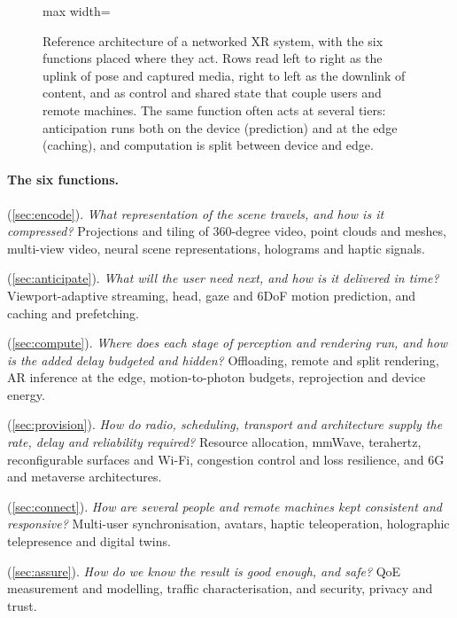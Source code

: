 \begin{figure}[t]
\begin{adjustbox}{max width=\linewidth}
\end{adjustbox}
\caption{Reference architecture of a networked XR system, with the six functions placed where they act.
Rows read left to right as the uplink of pose and captured media, right to left as the downlink of
content, and as control and shared state that couple users and remote machines. The same function often
acts at several tiers: anticipation runs both on the device (prediction) and at the edge (caching), and
computation is split between device and edge.}\label{fig:architecture}
\end{figure}

\paragraph{The six functions.}
\begin{description}[leftmargin=0pt,itemsep=2pt,font=\normalfont\bfseries]
  \item[Encode] (\cref{sec:encode}). \emph{What representation of the scene travels, and how is it
        compressed?} Projections and tiling of 360-degree video, point clouds and meshes, multi-view
        video, neural scene representations, holograms and haptic signals.
  \item[Anticipate] (\cref{sec:anticipate}). \emph{What will the user need next, and how is it delivered
        in time?} Viewport-adaptive streaming, head, gaze and 6DoF motion prediction, and caching and
        prefetching.
  \item[Compute] (\cref{sec:compute}). \emph{Where does each stage of perception and rendering run, and
        how is the added delay budgeted and hidden?} Offloading, remote and split rendering, AR inference
        at the edge, motion-to-photon budgets, reprojection and device energy.
  \item[Provision] (\cref{sec:provision}). \emph{How do radio, scheduling, transport and architecture
        supply the rate, delay and reliability required?} Resource allocation, mmWave, terahertz,
        reconfigurable surfaces and Wi-Fi, congestion control and loss resilience, and 6G and metaverse
        architectures.
  \item[Connect] (\cref{sec:connect}). \emph{How are several people and remote machines kept consistent
        and responsive?} Multi-user synchronisation, avatars, haptic teleoperation, holographic
        telepresence and digital twins.
  \item[Assure] (\cref{sec:assure}). \emph{How do we know the result is good enough, and safe?} QoE
        measurement and modelling, traffic characterisation, and security, privacy and trust.
\end{description}

